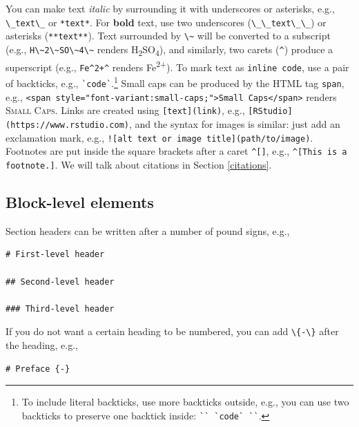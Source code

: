 \documentclass[doctor,openright,twoside]{sjtuthesis}
\newcommand{\passthrough}[1]{#1}
\theoremstyle{plain}
\theoremstyle{definition}
\theoremstyle{remark}
\theoremstyle{ocrenumbox}
\theoremstyle{plain}
\begin{document}
You can make text \emph{italic} by surrounding it with underscores or
asterisks, e.g., \passthrough{\lstinline!\_text\_!} or
\passthrough{\lstinline!*text*!}. For \textbf{bold} text, use two
underscores (\passthrough{\lstinline!\_\_text\_\_!}) or asterisks
(\passthrough{\lstinline!**text**!}). Text surrounded by
\passthrough{\lstinline!\~!} will be converted to a subscript (e.g.,
\passthrough{\lstinline!H\~2\~SO\~4\~!} renders
H\textsubscript{2}SO\textsubscript{4}), and similarly, two carets
(\passthrough{\lstinline!^!}) produce a superscript (e.g.,
\passthrough{\lstinline!Fe^2+^!} renders Fe\textsuperscript{2+}). To
mark text as \passthrough{\lstinline!inline code!}, use a pair of
backticks, e.g., \passthrough{\lstinline!`code`!}.\footnote{To include
  literal backticks, use more backticks outside, e.g., you can use two
  backticks to preserve one backtick inside:
  \passthrough{\lstinline!`` `code` ``!}.} Small caps can be produced by
the HTML tag \passthrough{\lstinline!span!}, e.g.,
\passthrough{\lstinline!<span style="font-variant:small-caps;">Small Caps</span>!}
renders \textsc{Small Caps}. Links are created using
\passthrough{\lstinline![text](link)!}, e.g.,
\passthrough{\lstinline![RStudio](https://www.rstudio.com)!}, and the
syntax for images is similar: just add an exclamation mark, e.g.,
\passthrough{\lstinline"![alt text or image title](path/to/image)"}.
Footnotes are put inside the square brackets after a caret
\passthrough{\lstinline!^[]!}, e.g.,
\passthrough{\lstinline!^[This is a footnote.]!}. We will talk about
citations in Section \ref{citations}.

\hypertarget{block-level-elements}{%
\subsection{Block-level elements}\label{block-level-elements}}

Section headers can be written after a number of pound signs, e.g.,

\begin{lstlisting}
# First-level header

## Second-level header

### Third-level header
\end{lstlisting}

If you do not want a certain heading to be numbered, you can add
\passthrough{\lstinline!\{-\}!} after the heading, e.g.,

\begin{lstlisting}
# Preface {-}
\end{lstlisting}
\end{document}
